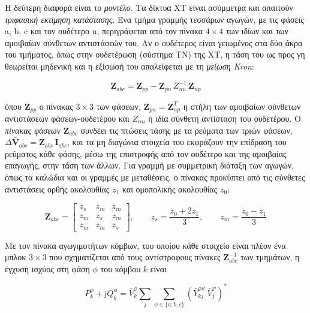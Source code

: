 Η δεύτερη διαφορά είναι το \emph{μοντέλο}. Τα δίκτυα ΧΤ είναι ασύμμετρα και απαιτούν
\emph{τριφασική εκτίμηση κατάστασης}. Ένα τμήμα γραμμής
τεσσάρων αγωγών, με τις φάσεις a, b, c και τον ουδέτερο n, περιγράφεται από τον πίνακα $4
\times 4$ των ιδίων και των αμοιβαίων σύνθετων αντιστάσεών του. Αν ο ουδέτερος είναι γειωμένος
στα δύο άκρα του τμήματος, όπως στην ουδετέρωση (σύστημα TN) της ΧΤ, η τάση του ως προς γη
θεωρείται μηδενική και η εξίσωσή του απαλείφεται με τη \emph{μείωση Kron}:

\begin{equation}
\mathbf{Z}_{abc} = \mathbf{Z}_{pp} - \mathbf{Z}_{pn}\,Z_{nn}^{-1}\,\mathbf{Z}_{np}
\label{eq:kron}
\end{equation}

όπου $\mathbf{Z}_{pp}$ ο πίνακας $3 \times 3$ των φάσεων, $\mathbf{Z}_{pn} = \mathbf{Z}_{np}^{T}$
η στήλη των αμοιβαίων σύνθετων αντιστάσεων φάσεων-ουδετέρου και $Z_{nn}$ η ιδία σύνθετη
αντίσταση του ουδετέρου. Ο \emph{πίνακας φάσεων} $\mathbf{Z}_{abc}$ συνδέει τις πτώσεις τάσης με
τα ρεύματα των τριών φάσεων, $\Delta\bar{\mathbf{V}}_{abc} = \mathbf{Z}_{abc}\,\bar{\mathbf{I}}_{abc}$,
και τα μη διαγώνια στοιχεία του εκφράζουν την επίδραση του ρεύματος κάθε φάσης, μέσω της
επιστροφής από τον ουδέτερο και της αμοιβαίας επαγωγής, στην τάση των άλλων. Για γραμμή με
συμμετρική διάταξη των αγωγών, όπως τα καλώδια και οι γραμμές με μεταθέσεις, ο πίνακας
προκύπτει από τις σύνθετες αντιστάσεις ορθής ακολουθίας $z_1$ και ομοπολικής ακολουθίας
$z_0$:

\begin{equation}
\mathbf{Z}_{abc} =
\begin{bmatrix} z_s & z_m & z_m \\ z_m & z_s & z_m \\ z_m & z_m & z_s \end{bmatrix}, \qquad
z_s = \frac{z_0 + 2z_1}{3}, \qquad z_m = \frac{z_0 - z_1}{3}
\label{eq:zabc-sym}
\end{equation}

Με τον πίνακα αγωγιμοτήτων κόμβων, του οποίου κάθε στοιχείο είναι πλέον ένα μπλοκ
$3 \times 3$ που σχηματίζεται από τους αντίστροφους πίνακες $\mathbf{Z}_{abc}^{-1}$ των
τμημάτων, η έγχυση ισχύος στη φάση $\phi$ του κόμβου $k$ είναι

\begin{equation}
P_k^{\phi} + \mathrm{j}Q_k^{\phi}
  = \bar{V}_k^{\phi} \sum_{j} \sum_{\psi \in \{a, b, c\}}
    \left(\bar{Y}_{kj}^{\phi\psi}\,\bar{V}_j^{\psi}\right)^{*}
\label{eq:dsse-3f}
\end{equation}


